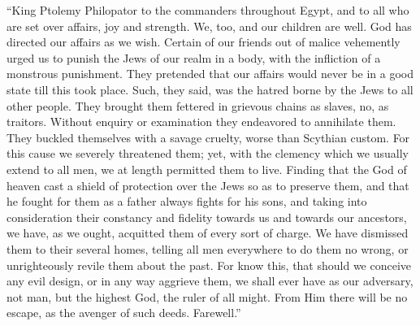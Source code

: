 ``King Ptolemy Philopator to the commanders throughout
Egypt, and to all who are set over affairs, joy and strength.
 We, too, and our children are well. God has directed our
affairs as we wish.  Certain of our friends out of malice
vehemently urged us to punish the Jews of our realm in a body, with the
infliction of a monstrous punishment.  They pretended that
our affairs would never be in a good state till this took place. Such,
they said, was the hatred borne by the Jews to all other people.
 They brought them fettered in grievous chains as slaves,
no, as traitors. Without enquiry or examination they endeavored to
annihilate them. They buckled themselves with a savage cruelty, worse
than Scythian custom.  For this cause we severely threatened
them; yet, with the clemency which we usually extend to all men, we at
length permitted them to live. Finding that the God of heaven cast a
shield of protection over the Jews so as to preserve them, and that he
fought for them as a father always fights for his sons,  and
taking into consideration their constancy and fidelity towards us and
towards our ancestors, we have, as we ought, acquitted them of every
sort of charge.  We have dismissed them to their several
homes, telling all men everywhere to do them no wrong, or unrighteously
revile them about the past.  For know this, that should we
conceive any evil design, or in any way aggrieve them, we shall ever
have as our adversary, not man, but the highest God, the ruler of all
might. From Him there will be no escape, as the avenger of such deeds.
Farewell.''

